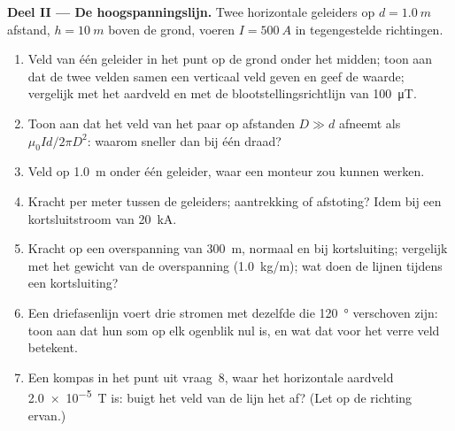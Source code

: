 \begin{problem}
\medskip
\noindent\textbf{Deel II --- De hoogspanningslijn.}
Twee horizontale geleiders op $d = \qty{1.0}{m}$ afstand, $h = \qty{10}{m}$ boven
de grond, voeren $I = \qty{500}{A}$ in tegengestelde richtingen.
\begin{enumerate}[resume]
  \item Veld van één geleider in het punt op de grond onder het
        midden; toon aan dat de twee velden samen een verticaal veld geven
        en geef de waarde; vergelijk met het aardveld en met de
        blootstellingsrichtlijn van \qty{100}{\micro T}.
  \item Toon aan dat het veld van het paar op afstanden $D \gg d$ afneemt als
        $\mu_0Id/2\pi D^2$: waarom sneller dan bij één draad?
  \item Veld op \qty{1.0}{m} onder één geleider, waar een monteur
        zou kunnen werken.
  \item Kracht per meter tussen de geleiders; aantrekking of
        afstoting? Idem bij een kortsluitstroom van \qty{20}{kA}.
  \item Kracht op een overspanning van \qty{300}{m}, normaal en bij kortsluiting;
        vergelijk met het gewicht van de overspanning (\qty{1.0}{kg/m}); wat doen de lijnen
        tijdens een kortsluiting?
  \item Een driefasenlijn voert drie stromen met dezelfde 
        die \qty{120}{\degree} verschoven zijn: toon aan dat hun som op
        elk ogenblik nul is, en wat dat voor het verre veld betekent.
  \item Een kompas in het punt uit vraag~8, waar het horizontale
        aardveld \qty{2.0e-5}{T} is: buigt het veld van de lijn het
        af? (Let op de richting ervan.)
\end{enumerate}


\end{problem}
